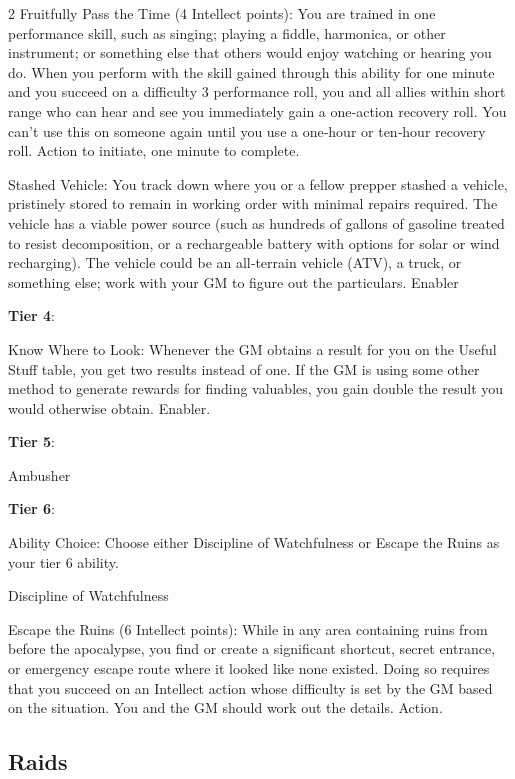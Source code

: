 \begin{multicols}{2}
Fruitfully Pass the Time (4 Intellect points): You are trained in one performance skill, such as singing; playing a fiddle, harmonica, or other instrument; or something else that others would enjoy watching or hearing you do. When you perform with the skill gained through this ability for one minute and you succeed on a difficulty 3 performance roll, you and all allies within short range who can hear and see you immediately gain a one‑action recovery roll. You can’t use this on someone again until you use a one‑hour or ten‑hour recovery roll. Action to initiate, one minute to complete.

Stashed Vehicle: You track down where you or a fellow prepper stashed a vehicle, pristinely stored to remain in working order with minimal repairs required. The vehicle has a viable power source (such as hundreds of gallons of gasoline treated to resist decomposition, or a rechargeable battery with options for solar or wind recharging). The vehicle could be an all‑terrain vehicle (ATV), a truck, or something else; work with your GM to figure out the particulars. Enabler

\textbf{Tier 4}:

Know Where to Look: Whenever the GM obtains a result for you on the Useful Stuff table, you get two results instead of one. If the GM is using some other method to generate rewards for finding valuables, you gain double the result you would otherwise obtain. Enabler.

\textbf{Tier 5}:

Ambusher

\textbf{Tier 6}:

Ability Choice: Choose either Discipline of Watchfulness or Escape the Ruins as your tier 6 ability.

Discipline of Watchfulness

Escape the Ruins (6 Intellect points): While in any area containing ruins from before the apocalypse, you find or create a significant shortcut, secret entrance, or emergency escape route where it looked like none existed. Doing so requires that you succeed on an Intellect action whose difficulty is set by the GM based on the situation. You and the GM should work out the details. Action.

\subsection{Raids}


\end{multicols}
